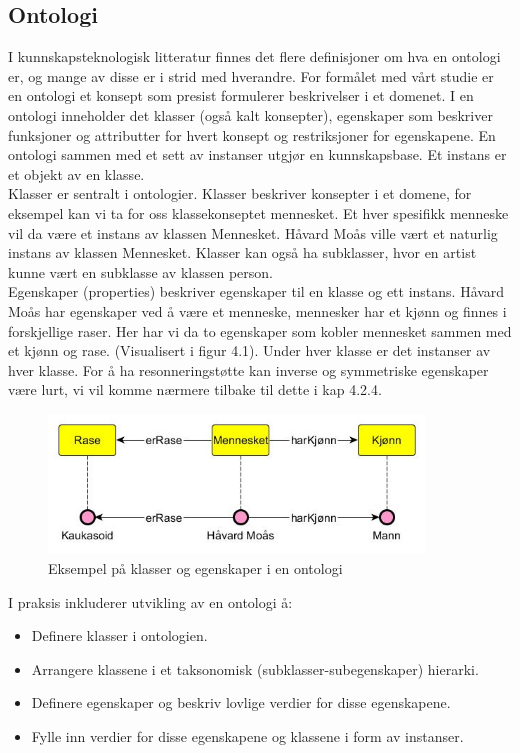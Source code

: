 \subsection{Ontologi}
\label{bakg:ontologi}
I kunnskapsteknologisk litteratur finnes det flere definisjoner om hva en ontologi er, og mange av disse er i strid med hverandre. For formålet med vårt studie er en ontologi et konsept som presist formulerer beskrivelser i et domenet. I en ontologi inneholder det klasser (også kalt konsepter), egenskaper som beskriver funksjoner og attributter for hvert konsept og restriksjoner for egenskapene. En ontologi sammen med et sett av instanser utgjør en kunnskapsbase. Et instans er et objekt av en klasse.\\
Klasser er sentralt i ontologier. Klasser beskriver konsepter i et domene, for eksempel kan vi ta for oss klassekonseptet mennesket. Et hver spesifikk menneske vil da være et instans av klassen Mennesket. Håvard Moås ville vært et naturlig instans av klassen Mennesket. Klasser kan også ha subklasser, hvor en artist kunne vært en subklasse av klassen person. \\
Egenskaper (properties) beskriver egenskaper til en klasse og ett instans. Håvard Moås har egenskaper ved å være et menneske, mennesker har et kjønn og finnes i forskjellige raser. Her har vi da to egenskaper som kobler mennesket sammen med et kjønn og rase. (Visualisert i figur 4.1). Under hver klasse er det instanser av hver klasse. For å ha resonneringstøtte kan inverse og symmetriske egenskaper være lurt, vi vil komme nærmere tilbake til dette i kap 4.2.4. %


\begin{figure}[H]
\centering
\includegraphics[width=10cm]{images/ontologi_eksempel.jpg}
\caption{Eksempel på klasser og egenskaper i en ontologi }
\end{figure}

I praksis inkluderer utvikling av en ontologi å:
\begin{itemize}
\item Definere klasser i ontologien.
\item Arrangere klassene i et taksonomisk (subklasser-subegenskaper) hierarki.
\item Definere egenskaper og beskriv lovlige verdier for disse egenskapene.
\item Fylle inn verdier for disse egenskapene og klassene i form av instanser.
\end{itemize} \citep{ontology_101}
